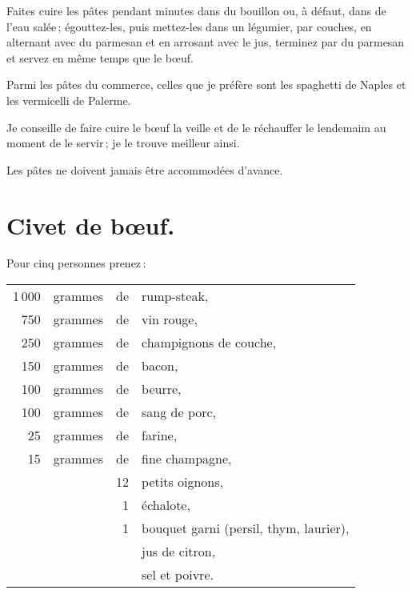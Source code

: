 Faites cuire les pâtes pendant {\mmm} minutes dans du bouillon ou,
à défaut, dans de l'eau salée ; égouttez-les, puis mettez-les dans un légumier,
par couches, en alternant avec du parmesan et en arrosant avec le jus, terminez
par du parmesan et servez en même temps que le bœuf.

Parmi les pâtes du commerce, celles que je préfère sont les spaghetti de Naples
et les vermicelli de Palerme.

Je conseille de faire cuire le bœuf la veille et de le réchauffer le lendemaim
au moment de le servir ; je le trouve meilleur ainsi.

Les pâtes ne doivent jamais être accommodées d'avance.

\section*{\centering Civet de bœuf.}
{}

Pour cinq personnes prenez :

\medskip

\footnotesize
\begin{longtable}{rrrp{16em}}
  1 000 & grammes & de & rump-steak,                                                                      \\
    750 & grammes & de & vin rouge,                                                                       \\
    250 & grammes & de & champignons de couche,                                                           \\
    150 & grammes & de & bacon,                                                                           \\
    100 & grammes & de & beurre,                                                                          \\
    100 & grammes & de & sang de porc,                                                                    \\
     25 & grammes & de & farine,                                                                          \\
     15 & grammes & de & fine champagne,                                                                  \\
        &         & 12 & petits oignons,                                                                  \\
        &         &  1 & échalote,                                                                        \\
        &         &  1 & bouquet garni (persil, thym, laurier),                                           \\
        &         &    & jus de citron,                                                                   \\
        &         &    & sel et poivre.                                                                   \\
\end{longtable}
\normalsize


